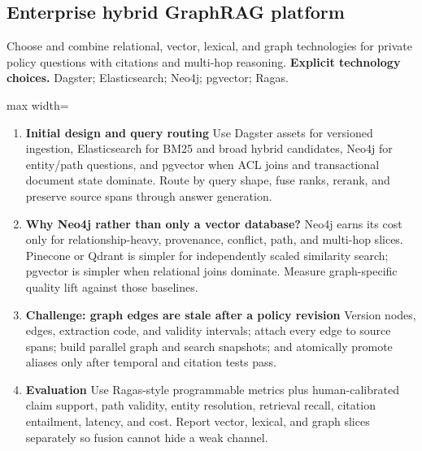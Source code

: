 \subsection{Enterprise hybrid GraphRAG platform}
Choose and combine relational, vector, lexical, and graph technologies for private policy questions with citations and multi-hop reasoning.
\textbf{Explicit technology choices.} Dagster; Elasticsearch; Neo4j; pgvector; Ragas.
\begin{center}\begin{adjustbox}{max width=\linewidth}\end{adjustbox}\end{center}
\begin{enumerate}
\item \textbf{Initial design and query routing} Use Dagster assets for versioned ingestion, Elasticsearch for BM25 and broad hybrid candidates, Neo4j for entity/path questions, and pgvector when ACL joins and transactional document state dominate. Route by query shape, fuse ranks, rerank, and preserve source spans through answer generation.
\item \textbf{Why Neo4j rather than only a vector database?} Neo4j earns its cost only for relationship-heavy, provenance, conflict, path, and multi-hop slices. Pinecone or Qdrant is simpler for independently scaled similarity search; pgvector is simpler when relational joins dominate. Measure graph-specific quality lift against those baselines.
\item \textbf{Challenge: graph edges are stale after a policy revision} Version nodes, edges, extraction code, and validity intervals; attach every edge to source spans; build parallel graph and search snapshots; and atomically promote aliases only after temporal and citation tests pass.
\item \textbf{Evaluation} Use Ragas-style programmable metrics plus human-calibrated claim support, path validity, entity resolution, retrieval recall, citation entailment, latency, and cost. Report vector, lexical, and graph slices separately so fusion cannot hide a weak channel.
\end{enumerate}
